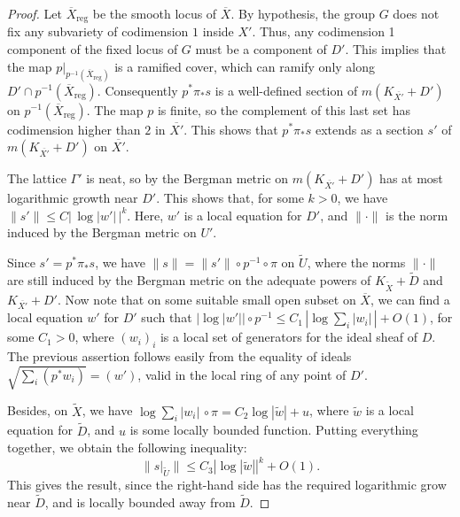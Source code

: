 \documentclass[10pt]{article}
\theoremstyle{definition}
\theoremstyle{remark}
\numberwithin{equation}{theorem}
\newcommand{\jepPubNorm}[1]{\lVert #1\rVert}
\newcommand{\jepPubAbs}[1]{\left|#1\right|}
\begin{document}
\begin{proof}


Let $\overline{X}_{\mathrm{reg}}$ be the smooth locus of $\overline{X}$. By hypothesis, the group $G$ does not fix any subvariety of codimension $1$ inside $X'$. Thus, any codimension 1 component of the fixed locus of $G$ must be a component of $D'$. This implies that the map $p|_{p^{-1} (\overline{X}_{\mathrm{reg}})}$ is a ramified cover, which can ramify only along $D'\cap  p^{-1}(\overline{X}_{\mathrm{reg}})$. Consequently $p^\ast \pi_\ast s$ is a well-defined section of $m( K_{\overline{X'}} + D')$ on $p^{-1}(\overline{X}_{\mathrm{reg}})$. The map $p$ is finite, so the complement of this last set has codimension higher than $2$ in $\overline{X'}$. This shows that $p^\ast \pi_\ast s$ extends as a section $s'$ of $m( K_{\overline{X'}} + D')$ on $\overline{X'}$.

The lattice $\Gamma'$ is neat, so by \cite{pubref23} the Bergman metric on $m(K_{\overline{X'}} + D')$ has at most logarithmic growth near $D'$. This shows that, for some $k > 0$, we have $\jepPubNorm{s'} \leqslant C |\, \log |w'| \,| ^k$. Here, $w'$ is a local equation for $D'$, and $\jepPubNorm{\cdot}$ is the norm induced by the Bergman metric on $U'$. 

Since $s' = p^\ast \pi_\ast s$, we have $\jepPubNorm{s} = \jepPubNorm{s'} \circ p^{-1} \circ \pi$ on $\widetilde{U}$, where the norms $\jepPubNorm{\cdot}$ are still induced by the Bergman metric on the adequate powers of $K_{\widetilde{X}} + \widetilde{D}$ and $K_{\overline{X'}} + D'$. Now note that on some suitable small open subset on $\overline{X}$, we can find a local equation $w'$ for $D'$ such that $\left| \log |w'| \right| \circ p^{-1} \leqslant C_1 \,   \left| \log \sum_i |w_i|  \, \right| + O(1)$, for some $C_1 > 0$, where $(w_i)_i$ is a local set of generators for the ideal sheaf of $D$. The previous assertion follows easily from the equality of ideals $\sqrt{\sum_i \left( p^\ast w_i \right)} = \left( w' \right)$, valid in the local ring of any point of $D'$.

Besides, on $\widetilde{X}$, we have $ \log \sum_i |w_i| \,  \circ \pi = C_2 \log |\widetilde{w}| + u$, where $\widetilde{w}$ is a local equation for $\widetilde{D}$, and $u$ is some locally bounded function. Putting everything together, we obtain the following inequality:
$$
\jepPubNorm{ \left. s \right|_{\widetilde{U}} } \leqslant C_3 \jepPubAbs{ \log \jepPubAbs{\widetilde{w}}}^k + O(1).
$$
This gives the result, since the right-hand side has the required logarithmic grow near $\widetilde{D}$, and is locally bounded away from $\widetilde{D}$.
\end{proof}
\end{document}
